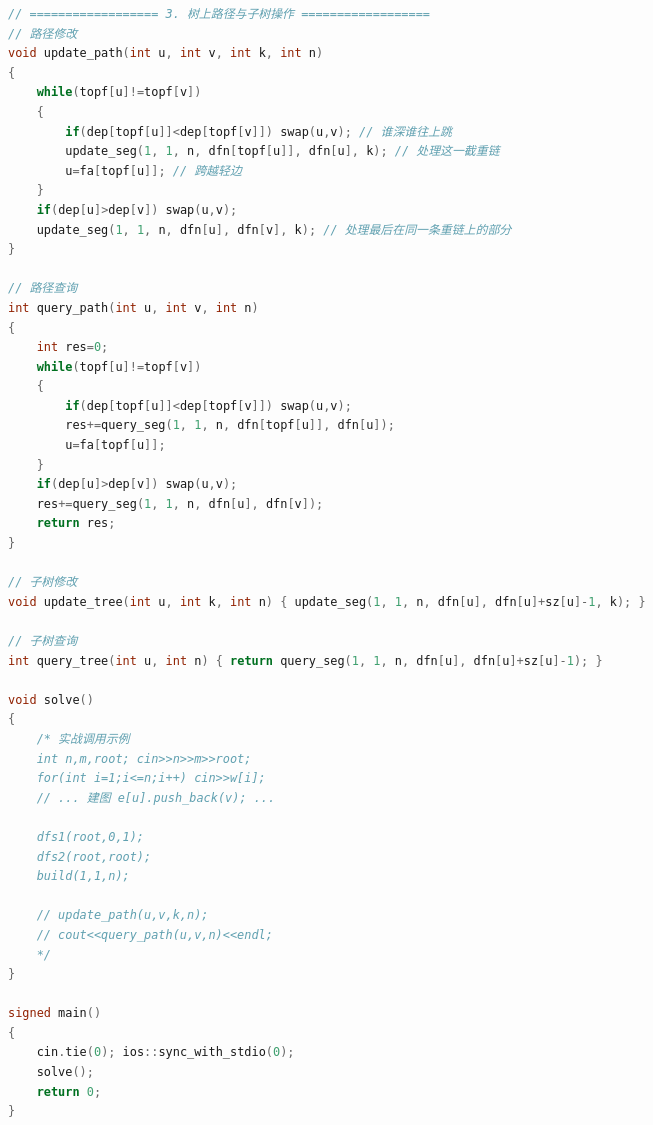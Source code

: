 \documentclass[10pt,landscape,a4paper]{article}
\begin{document}
\begin{multicols*}{3}
\begin{lstlisting}[language=C++]
// ================== 3. 树上路径与子树操作 ==================
// 路径修改
void update_path(int u, int v, int k, int n)
{
    while(topf[u]!=topf[v])
    {
        if(dep[topf[u]]<dep[topf[v]]) swap(u,v); // 谁深谁往上跳
        update_seg(1, 1, n, dfn[topf[u]], dfn[u], k); // 处理这一截重链
        u=fa[topf[u]]; // 跨越轻边
    }
    if(dep[u]>dep[v]) swap(u,v);
    update_seg(1, 1, n, dfn[u], dfn[v], k); // 处理最后在同一条重链上的部分
}

// 路径查询
int query_path(int u, int v, int n)
{
    int res=0;
    while(topf[u]!=topf[v])
    {
        if(dep[topf[u]]<dep[topf[v]]) swap(u,v);
        res+=query_seg(1, 1, n, dfn[topf[u]], dfn[u]);
        u=fa[topf[u]];
    }
    if(dep[u]>dep[v]) swap(u,v);
    res+=query_seg(1, 1, n, dfn[u], dfn[v]);
    return res;
}

// 子树修改
void update_tree(int u, int k, int n) { update_seg(1, 1, n, dfn[u], dfn[u]+sz[u]-1, k); }

// 子树查询
int query_tree(int u, int n) { return query_seg(1, 1, n, dfn[u], dfn[u]+sz[u]-1); }

void solve()
{
    /* 实战调用示例
    int n,m,root; cin>>n>>m>>root;
    for(int i=1;i<=n;i++) cin>>w[i];
    // ... 建图 e[u].push_back(v); ...
    
    dfs1(root,0,1);
    dfs2(root,root);
    build(1,1,n);
    
    // update_path(u,v,k,n);
    // cout<<query_path(u,v,n)<<endl;
    */
}

signed main()
{
    cin.tie(0); ios::sync_with_stdio(0);
    solve();
    return 0;
}
\end{lstlisting}

\end{multicols*}
\end{document}
